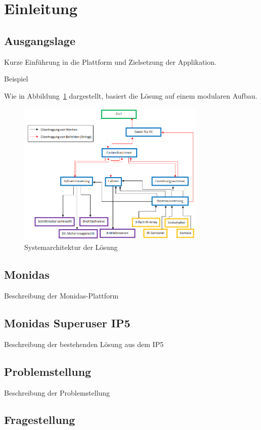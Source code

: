 \section{Einleitung}

\subsection{Ausgangslage}
Kurze Einführung in die Plattform und Zielsetzung der Applikation.

Beispiel

Wie in Abbildung~\ref{fig:architektur} dargestellt, basiert die Lösung auf einem modularen Aufbau.

\begin{figure}[h]
  \centering
  \includegraphics[width=0.8\textwidth]{graphics/software_struktur.png}
  \caption{Systemarchitektur der Lösung}
  \label{fig:architektur}
\end{figure}

\subsection{Monidas}
Beschreibung der Monidas-Plattform

\subsection{Monidas Superuser IP5}
Beschreibung der bestehenden Lösung aus dem IP5

\subsection{Problemstellung}
Beschreibung der Problemstellung

\subsection{Fragestellung}


